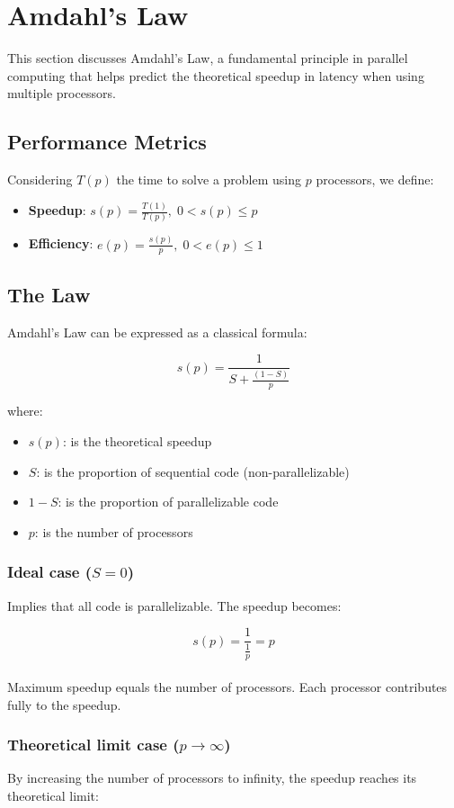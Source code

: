 \newpage
\section{Amdahl's Law}

This section discusses Amdahl's Law, a fundamental principle in parallel computing that helps predict the theoretical speedup in latency when using multiple processors.

\subsection{Performance Metrics}
Considering $T(p)$ the time to solve a problem using $p$ processors, we define:
\begin{itemize}
    \item \textbf{Speedup}: $s(p) = \frac{T(1)}{T(p)},\; 0 < s(p) \le p$
    \item \textbf{Efficiency}: $e(p) = \frac{s(p)}{p},\; 0 < e(p) \le 1$
\end{itemize}

\subsection{The Law}
Amdahl's Law can be expressed as a classical formula:

\[
s(p) = \frac{1}{S + \frac{(1-S)}{p}}
\]

where:
\begin{itemize}
    \item $s(p)$: is the theoretical speedup
    \item $S$: is the proportion of sequential code (non-parallelizable)
    \item $1-S$: is the proportion of parallelizable code
    \item $p$: is the number of processors
\end{itemize}

\subsubsection*{Ideal case ($S=0$)}
Implies that all code is parallelizable. The speedup becomes:

\[
s(p) = \frac{1}{\frac{1}{p}} = {p}
\]
\\
Maximum speedup equals the number of processors. Each processor contributes fully to the speedup.

\subsubsection*{Theoretical limit case ($p \to \infty $)}
By increasing the number of processors to infinity, the speedup reaches its theoretical limit:

